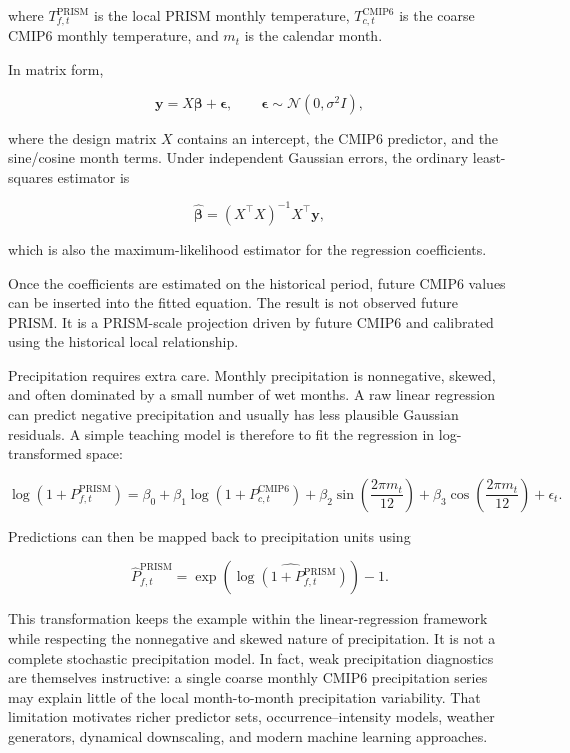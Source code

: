 \documentclass[11pt]{article}
\begin{document}
where $T_{f,t}^{\mathrm{PRISM}}$ is the local PRISM monthly temperature, $T_{c,t}^{\mathrm{CMIP6}}$ is the coarse CMIP6 monthly temperature, and $m_t$ is the calendar month.

In matrix form,

\begin{equation}
\mathbf{y}=X\boldsymbol{\beta}+\boldsymbol{\epsilon},
\qquad
\boldsymbol{\epsilon}\sim\mathcal{N}(0,\sigma^2 I),
\end{equation}

where the design matrix $X$ contains an intercept, the CMIP6 predictor, and the sine/cosine month terms. Under independent Gaussian errors, the ordinary least-squares estimator is

\begin{equation}
\widehat{\boldsymbol{\beta}}
=
(X^\top X)^{-1}X^\top \mathbf{y},
\end{equation}

which is also the maximum-likelihood estimator for the regression coefficients.

Once the coefficients are estimated on the historical period, future CMIP6 values can be inserted into the fitted equation. The result is not observed future PRISM. It is a PRISM-scale projection driven by future CMIP6 and calibrated using the historical local relationship.

Precipitation requires extra care. Monthly precipitation is nonnegative, skewed, and often dominated by a small number of wet months. A raw linear regression can predict negative precipitation and usually has less plausible Gaussian residuals. A simple teaching model is therefore to fit the regression in log-transformed space:

\begin{equation}
\log\left(1+P_{f,t}^{\mathrm{PRISM}}\right)
=
\beta_0
+
\beta_1 \log\left(1+P_{c,t}^{\mathrm{CMIP6}}\right)
+
\beta_2 \sin\left(\frac{2\pi m_t}{12}\right)
+
\beta_3 \cos\left(\frac{2\pi m_t}{12}\right)
+
\epsilon_t.
\end{equation}

Predictions can then be mapped back to precipitation units using

\begin{equation}
\widehat{P}_{f,t}^{\mathrm{PRISM}}
=
\exp\left(\widehat{\log(1+P_{f,t}^{\mathrm{PRISM}})}\right)-1.
\end{equation}

This transformation keeps the example within the linear-regression framework while respecting the nonnegative and skewed nature of precipitation. It is not a complete stochastic precipitation model. In fact, weak precipitation diagnostics are themselves instructive: a single coarse monthly CMIP6 precipitation series may explain little of the local month-to-month precipitation variability. That limitation motivates richer predictor sets, occurrence--intensity models, weather generators, dynamical downscaling, and modern machine learning approaches.
\end{document}
